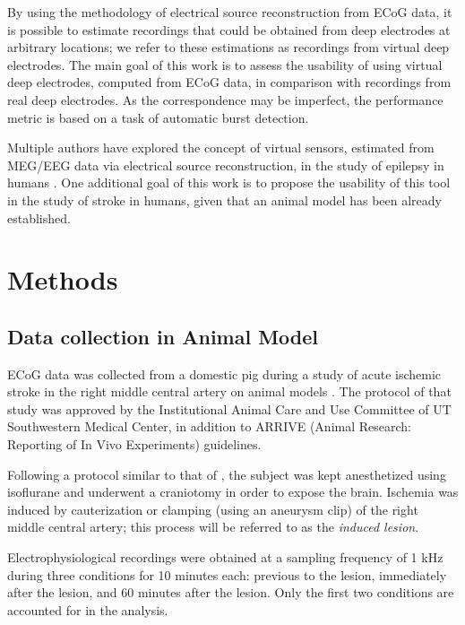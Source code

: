 \documentclass[draftcls, onecolumn, peerreview]{IEEEtran}
\begin{document}
By using the methodology of electrical source reconstruction from ECoG data, it is possible to estimate recordings that could be obtained from deep electrodes at arbitrary locations; we refer to these estimations as recordings from virtual deep electrodes.
%
The main goal of this work is to assess the usability of using virtual deep electrodes, computed from ECoG data, in comparison with recordings from real deep electrodes.
%
As the correspondence may be imperfect, the performance metric is based on a task of automatic burst detection.

Multiple authors have explored the concept of virtual sensors, estimated from MEG/EEG data via electrical source reconstruction, in the study of epilepsy in humans \cite{hillebrand2005new,tamilia2021noninvasive,sohrabpour2020noninvasive}. 
%
One additional goal of this work is to propose the usability of this tool in the study of stroke in humans, given that an animal model has been already established.


\section{Methods}

\subsection{Data collection in Animal Model}

ECoG data was collected from a domestic pig during a study of acute ischemic stroke in the right middle central artery on animal models \cite{PMID_36109613}.
%
The protocol of that study was approved by the Institutional Animal Care and Use Committee of UT Southwestern Medical Center, in addition to ARRIVE (Animal Research: Reporting of In Vivo Experiments) guidelines.

Following a protocol similar to that of \cite{pig_lesion1}, the subject was kept anesthetized using isoflurane and underwent a craniotomy in order to expose the brain. 
%
Ischemia was induced by cauterization or clamping (using an aneurysm clip) of the right middle central artery; this process will be referred to as the \textit{induced lesion}.

Electrophysiological recordings were obtained at a sampling frequency of 1 kHz during three conditions for 10 minutes each:
previous to the lesion, immediately after the lesion, and 60 minutes after the lesion.
%
Only the first two conditions are accounted for in the analysis.
\end{document}
